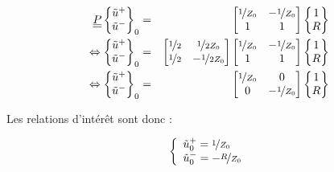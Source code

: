 \begin{eqnarray*}
	\underline{\underline{P}}
	\begin{Bmatrix}
		\tilde{u}^+\\
		\tilde{u}^-
	\end{Bmatrix}_0 & = &
	\begin{bmatrix}
		\nicefrac{1}{Z_0} & -\nicefrac{1}{Z_0}\\
		1 & 1
	\end{bmatrix}
	\begin{Bmatrix}
		1\\
		R
	\end{Bmatrix}\\
	\Leftrightarrow
	\begin{Bmatrix}
		\tilde{u}^+\\
		\tilde{u}^-
	\end{Bmatrix}_0 & = &
	\begin{bmatrix}
		\nicefrac{1}{2} & \nicefrac{1}{2Z_0}\\
		\nicefrac{1}{2} & -\nicefrac{1}{2Z_0}\\
	\end{bmatrix}
	\begin{bmatrix}
		\nicefrac{1}{Z_0} & -\nicefrac{1}{Z_0}\\
		1 & 1
	\end{bmatrix}
	\begin{Bmatrix}
		1\\
		R
	\end{Bmatrix}\\
	\Leftrightarrow
	\begin{Bmatrix}
		\tilde{u}^+\\
		\tilde{u}^-
	\end{Bmatrix}_0 & = &
	\begin{bmatrix}
		\nicefrac{1}{Z_0} & 0\\
		0 & -\nicefrac{1}{Z_0}
	\end{bmatrix}
	\begin{Bmatrix}
		1\\
		R
	\end{Bmatrix}\\
\end{eqnarray*}

Les relations d'intérêt sont donc :

\begin{equation}
	\left\{
		\begin{array}{l}
			\tilde{u}^+_0 = \nicefrac{1}{Z_0}\\
			\tilde{u}^-_0 = -\nicefrac{R}{Z_0}\\
		\end{array}
	\right. \label{rflx:useful_rels}
\end{equation}


